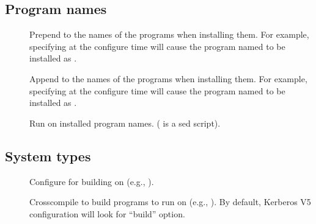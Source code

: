 \documentclass[letterpaper,10pt,english]{sphinxmanual}
\begin{document}
\subsection{Program names}
\label{\detokenize{build/options2configure:program-names}}\begin{description}
\item[{\sphinxstylestrong{\sphinxhyphen{}}}] \leavevmode
\sphinxAtStartPar
Prepend  to the names of the programs when installing
them. For example, specifying  at the
configure time will cause the program named  to be
installed as .

\item[{\sphinxstylestrong{\sphinxhyphen{}}}] \leavevmode
\sphinxAtStartPar
Append  to the names of the programs when installing them.
For example, specifying  at the configure
time will cause the program named  to be installed as
.

\item[{\sphinxstylestrong{\sphinxhyphen{}}}] \leavevmode
\sphinxAtStartPar
Run  on installed program names. ( is a
sed script).

\end{description}


\subsection{System types}
\label{\detokenize{build/options2configure:system-types}}\begin{description}
\item[{\sphinxstylestrong{\sphinxhyphen{}}}] \leavevmode
\sphinxAtStartPar
Configure for building on 
(e.g., ).

\item[{\sphinxstylestrong{\sphinxhyphen{}}}] \leavevmode
\sphinxAtStartPar
Cross\sphinxhyphen{}compile to build programs to run on 
(e.g., ).  By default, Kerberos V5
configuration will look for “build” option.

\end{description}
\end{document}
